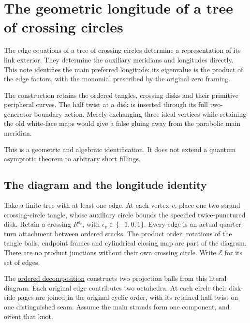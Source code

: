 \chapter{The geometric longitude of a tree of crossing circles}
\label{app:geometric-characteristic}\label{gi:the-geometric-longitude-of-a-tree-of-crossing-circles}

The edge equations of a tree of crossing circles determine a representation
of its link exterior. They determine the auxiliary meridians and longitudes
directly. This note identifies the main preferred longitude: its eigenvalue
is the product of the edge factors, with the monomial prescribed by the
original zero framing.

The construction retains the ordered tangles, crossing disks and their
primitive peripheral curves. The half twist at a disk is inserted through
its full two-generator boundary action. Merely exchanging three ideal
vertices while retaining the old white-face maps would give a false gluing
away from the parabolic main meridian.

This is a geometric and algebraic identification. It does not extend a
quantum asymptotic theorem to arbitrary short fillings.

\section{The diagram and the longitude identity}\label{gi:the-diagram-and-the-longitude-identity}

Take a finite tree with at least one edge. At each vertex \(v\), place
one two-strand crossing-circle tangle, whose auxiliary circle bounds
the specified twice-punctured disk. Retain a crossing
\(R^{\epsilon_v}\), with \(\epsilon_v\in\{-1,0,1\}\).
Every edge is an actual quarter-turn attachment between ordered stacks.
The product order, rotations of the tangle balls, endpoint frames and
cylindrical closing map are part of the diagram. There are no product
junctions without their own crossing circle.
Write \(\mathcal E\) for its set of edges.

The \href{https://sashakolpakov.github.io/murakamis_dream/notes/actual_all_circle_octahedral_decomposition.html}{ordered decomposition}
constructs two projection balls from this literal diagram. Each original
edge contributes two octahedra. At each circle their disk-side pages
are joined in the original cyclic order, with its retained half twist
on one distinguished seam. Assume the main strands form one component,
and orient that knot.

